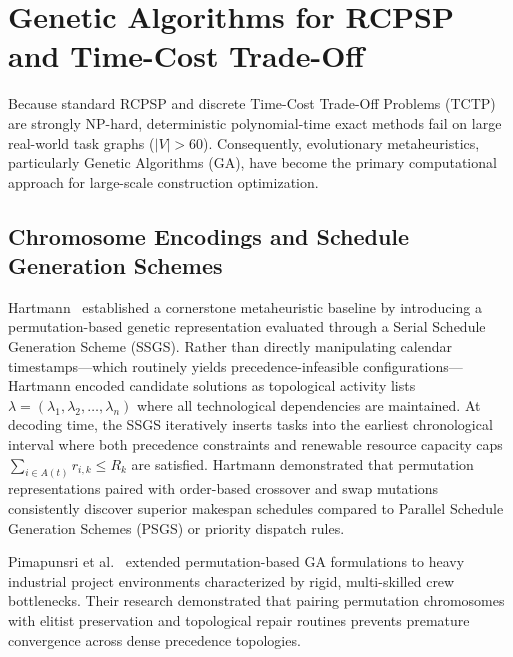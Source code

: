 \documentclass[conference]{IEEEtran}
\begin{document}
\section{Genetic Algorithms for RCPSP and Time-Cost Trade-Off}

Because standard RCPSP and discrete Time-Cost Trade-Off Problems (TCTP) are strongly NP-hard, deterministic polynomial-time exact methods fail on large real-world task graphs ($|V| > 60$). Consequently, evolutionary metaheuristics, particularly Genetic Algorithms (GA), have become the primary computational approach for large-scale construction optimization.

\subsection{Chromosome Encodings and Schedule Generation Schemes}
Hartmann~\cite{hartmann1998competitive} established a cornerstone metaheuristic baseline by introducing a permutation-based genetic representation evaluated through a Serial Schedule Generation Scheme (SSGS). Rather than directly manipulating calendar timestamps—which routinely yields precedence-infeasible configurations—Hartmann encoded candidate solutions as topological activity lists $\lambda = (\lambda_1, \lambda_2, \dots, \lambda_n)$ where all technological dependencies are maintained. At decoding time, the SSGS iteratively inserts tasks into the earliest chronological interval where both precedence constraints and renewable resource capacity caps $\sum_{i \in A(t)} r_{i, k} \le R_k$ are satisfied. Hartmann demonstrated that permutation representations paired with order-based crossover and swap mutations consistently discover superior makespan schedules compared to Parallel Schedule Generation Schemes (PSGS) or priority dispatch rules.

Pimapunsri et al.~\cite{pimapunsri2022genetic} extended permutation-based GA formulations to heavy industrial project environments characterized by rigid, multi-skilled crew bottlenecks. Their research demonstrated that pairing permutation chromosomes with elitist preservation and topological repair routines prevents premature convergence across dense precedence topologies.
\end{document}
